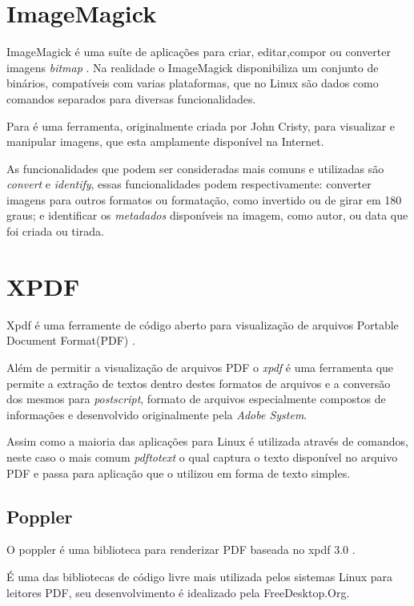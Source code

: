 \section{ImageMagick}

ImageMagick é uma suíte de aplicações para criar, editar,compor ou converter imagens \textit{bitmap} \cite{IMAGEMAGICK-STUDIO}.
Na realidade o ImageMagick disponibiliza um conjunto de binários, compatíveis com varias plataformas, que no Linux são dados como comandos separados para diversas funcionalidades.

Para \cite{TESLA} é uma ferramenta, originalmente criada por John Cristy, para visualizar e manipular imagens, que esta amplamente disponível na Internet.

As funcionalidades que podem ser consideradas mais comuns e utilizadas são \textit{convert} e \textit{identify}, essas funcionalidades podem respectivamente: converter imagens para outros formatos ou formatação, como invertido ou de girar em 180 graus; e identificar os \textit{metadados} disponíveis na imagem, como autor, ou data que foi criada ou tirada.

\section{XPDF}

Xpdf é uma ferramente de código aberto para visualização de arquivos Portable Document Format(PDF) \cite{GLYPH-COG}.

Além de permitir a visualização de arquivos PDF o \textit{xpdf} é uma ferramenta que permite a extração de textos dentro destes formatos de arquivos e a conversão dos mesmos para \textit{postscript}, formato de arquivos especialmente compostos de informações e desenvolvido originalmente pela \textit{Adobe System}.

Assim como a maioria das aplicações para Linux é utilizada através de comandos, neste caso o mais comum \textit{pdftotext} o qual captura o texto disponível no arquivo PDF e passa para aplicação que o utilizou em forma de texto simples.

\subsection{Poppler}

O poppler é uma biblioteca para renderizar PDF baseada no xpdf 3.0 \cite{JOHNSON}.

É uma das bibliotecas de código livre mais utilizada pelos sistemas Linux para leitores PDF, seu desenvolvimento é idealizado pela FreeDesktop.Org.

